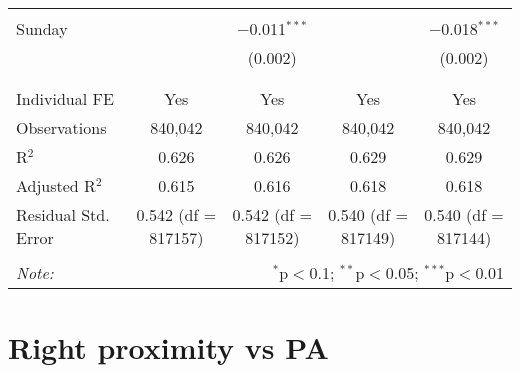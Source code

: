 \documentclass[
]{article}
\begin{document}
\begin{table}[!htbp]
{\begin{tabular}{@{\extracolsep{5pt}}lcccc}
  & & & & \\ 
 Sunday &  & $-$0.011$^{***}$ &  & $-$0.018$^{***}$ \\ 
  &  & (0.002) &  & (0.002) \\ 
  & & & & \\ 
\hline \\[-1.8ex] 
Individual FE & Yes & Yes & Yes & Yes \\ 
Observations & 840,042 & 840,042 & 840,042 & 840,042 \\ 
R$^{2}$ & 0.626 & 0.626 & 0.629 & 0.629 \\ 
Adjusted R$^{2}$ & 0.615 & 0.616 & 0.618 & 0.618 \\ 
Residual Std. Error & 0.542 (df = 817157) & 0.542 (df = 817152) & 0.540 (df = 817149) & 0.540 (df = 817144) \\ 
\hline 
\hline \\[-1.8ex] 
\textit{Note:}  & \multicolumn{4}{r}{$^{*}$p$<$0.1; $^{**}$p$<$0.05; $^{***}$p$<$0.01} \\ 
\end{tabular}
} 
\end{table} 
\newpage
\section{Right proximity vs PA}
\end{document}
